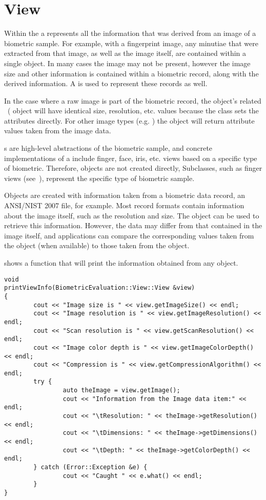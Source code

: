 %
%
\chapter{View}
\label{chp-view}
Within the \lname a  represents all the information that was derived
from an image of a biometric sample. For example, with a fingerprint image, any
minutiae that were extracted from that image, as well as the image itself,
are contained within a single  object. In many cases the image may
not be present, however the image size and other information is contained within
a biometric record, along with the derived information. A  is used
to represent these records as well.

In the case where a raw image is part of the biometric record, the  
object's related ~( object will have identical
size,
resolution, etc. values because the  class sets the 
attributes directly.
For other image types (e.g. ) the  object will return
attribute values taken from the image data.

s are high-level abstractions of the biometric sample, and concrete
implementations of a  include finger, face, iris, etc. views based
on a specific type of biometric. Therefore,  objects are not
created directly, Subclasses, such as finger views (see~),
represent the specific type of biometric sample.

Objects are created with information taken from a biometric data
record, an ANSI/NIST 2007 file, for example. Most record formats contain 
information about the image itself, such as the resolution and size. The 
 object can
be used to retrieve this information. However, the data may differ from that
contained in the image itself, and applications can compare the corresponding
values taken from the  object (when available) to those taken from 
the  object.

 shows a function that will print the information obtained
from any  object.

\begin{lstlisting}[caption={View::View Class}, label=lst:viewuse]
void
printViewInfo(BiometricEvaluation::View::View &view)
{
        cout << "Image size is " << view.getImageSize() << endl;
        cout << "Image resolution is " << view.getImageResolution() << endl;
        cout << "Scan resolution is " << view.getScanResolution() << endl;
        cout << "Image color depth is " << view.getImageColorDepth() << endl;
        cout << "Compression is " << view.getCompressionAlgorithm() << endl;
        try {
                auto theImage = view.getImage();
                cout << "Information from the Image data item:" << endl;
                cout << "\tResolution: " << theImage->getResolution() << endl;
                cout << "\tDimensions: " << theImage->getDimensions() << endl;
                cout << "\tDepth: " << theImage->getColorDepth() << endl;
        } catch (Error::Exception &e) {
                cout << "Caught " << e.what() << endl;
        }
}
\end{lstlisting}
